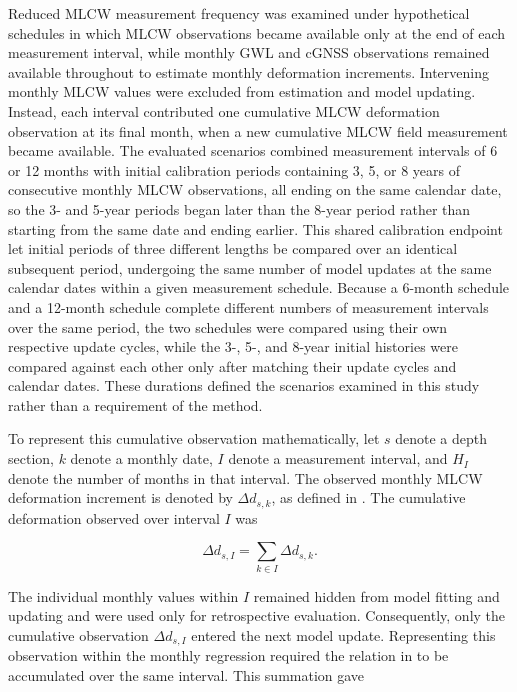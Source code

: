 Reduced MLCW measurement frequency was examined under hypothetical schedules in which MLCW observations became available only at the end of each measurement interval, while monthly GWL and cGNSS observations remained available throughout to estimate monthly deformation increments.
Intervening monthly MLCW values were excluded from estimation and model updating. Instead, each interval contributed one cumulative MLCW deformation observation at its final month, when a new cumulative MLCW field measurement became available.
The evaluated scenarios combined measurement intervals of 6 or 12 months with initial calibration periods containing 3, 5, or 8 years of consecutive monthly MLCW observations, all ending on the same calendar date, so the 3- and 5-year periods began later than the 8-year period rather than starting from the same date and ending earlier. This shared calibration endpoint let initial periods of three different lengths be compared over an identical subsequent period, undergoing the same number of model updates at the same calendar dates within a given measurement schedule.
Because a 6-month schedule and a 12-month schedule complete different numbers of measurement intervals over the same period, the two schedules were compared using their own respective update cycles, while the 3-, 5-, and 8-year initial histories were compared against each other only after matching their update cycles and calendar dates.
These durations defined the scenarios examined in this study rather than a requirement of the method.

To represent this cumulative observation mathematically, let $s$ denote a depth section, $k$ denote a monthly date, $I$ denote a measurement interval, and $H_I$ denote the number of months in that interval. The observed monthly MLCW deformation increment is denoted by $\Delta d_{s,k}$, as defined in . The cumulative deformation observed over interval $I$ was

\begin{equation}
\Delta d_{s,I}
=
\sum_{k\in I}\Delta d_{s,k}.
\label{eq:cumulative_deformation_observation}
\end{equation}

The individual monthly values within $I$ remained hidden from model fitting and updating and were used only for retrospective evaluation. Consequently, only the cumulative observation $\Delta d_{s,I}$ entered the next model update. Representing this observation within the monthly regression required the relation in  to be accumulated over the same interval. This summation gave

